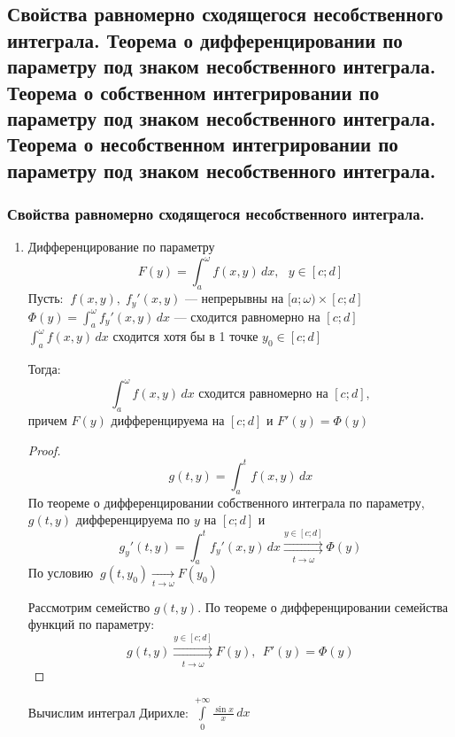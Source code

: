\subsection{Свойства равномерно сходящегося несобственного интеграла. Теорема о дифференцировании по параметру под знаком несобственного интеграла. Теорема о собственном интегрировании по параметру под знаком несобственного интеграла. Теорема о несобственном интегрировании по параметру под знаком несобственного интеграла.}

\subsubsection{Свойства равномерно сходящегося несобственного интеграла.}
    \begin{properties}
    \begin{enumerate}
        \item Дифференцирование по параметру
        \[ F(y) = \int_a^{\omega} f(x, y)\,dx, \ \ \ y \in [c; d] \]
        Пусть: $\ f(x, y), \; f_y'(x, y)$ --- непрерывны на $[a; \omega) \times [c; d]$ \\
        \phantom{Пусть} $\Phi(y) = \int_a^{\omega} f_y'(x, y)\,dx$ --- сходится равномерно на $[c; d]$ \\
        \phantom{Пусть} $\int_a^{\omega} f(x, y)\,dx$ сходится хотя бы в 1 точке $y_0 \in [c; d]$
        
        Тогда:
        \[ \int_a^{\omega} f(x, y)\,dx \text{ сходится равномерно на } [c; d], \]
        причем $F(y)$ дифференцируема на $[c; d]$ и $F'(y) = \Phi(y)$
        \begin{proof}
            \[ g(t, y) = \int_a^t f(x, y)\,dx \]
            По теореме о дифференцировании собственного интеграла по параметру, $g(t, y)$ дифференцируема по $y$ на $[c; d]$ и 
            \[ g_y'(t, y) = \int_a^t f_y'(x, y)\,dx \overset{y \in [c; d]}{\underset{t \to \omega}{\rightrightarrows}} \Phi(y) \]
            По условию $\ g(t, y_0) \xrightarrow[t \to \omega]{} F(y_0)$
            
            Рассмотрим семейство $g(t, y)$. По теореме о дифференцировании семейства функций по параметру:
            \[ g(t, y) \overset{y \in [c; d]}{\underset{t \to \omega}{\rightrightarrows}} F(y), \ \ F'(y) = \Phi(y) \]
        \end{proof}
        
        \begin{example}
            Вычислим интеграл Дирихле: $\int\limits_0^{+\infty} \frac{\sin x}x\,dx$
            

\end{example}
\end{enumerate}
\end{properties}
